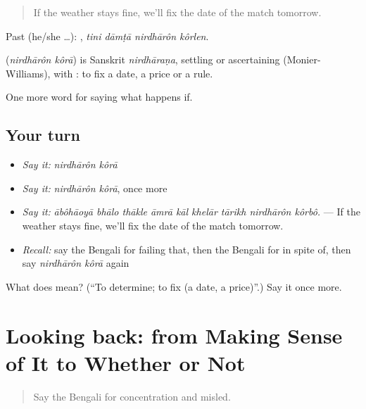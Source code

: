 \begin{quote}
If the weather stays fine, we'll fix the date of the match tomorrow.
\end{quote}

Past (he/she …):    , \emph{tini dāmṭā nirdhārôn kôrlen}.

\begin{cousinweb}
\textbf{ } (\emph{nirdhārôn kôrā}) is Sanskrit \emph{nirdhāraṇa}, settling or ascertaining (Monier-Williams), with : to fix a date, a price or a rule.
\end{cousinweb}

\begin{grammarlens}[title={What you've built}]
One more word for saying what happens if.
\end{grammarlens}

\subsection*{Your turn}
\begin{itemize}
\raggedright
  \item \emph{Say it:} \emph{nirdhārôn kôrā}
  \item \emph{Say it:} \emph{nirdhārôn kôrā}, once more
  \item \emph{Say it:} \emph{ābôhāoyā bhālo thākle āmrā kāl khelār tārikh nirdhārôn kôrbô.} — If the weather stays fine, we'll fix the date of the match tomorrow.
  \item \emph{Recall:} say the Bengali for failing that, then the Bengali for in spite of, then say \emph{nirdhārôn kôrā} again
\end{itemize}

\begin{tcolorbox}[breakable,colback=teal!4,colframe=teal!35!black,title={Before you move on}]
What does   mean? (\textquotedblleft{}To determine; to fix (a date, a price)\textquotedblright{}.) Say it once more.
\end{tcolorbox}
\section[(dialogue)]{Looking back: from Making Sense of It to Whether or Not}

\label{lesson:BN-R369-review-362-369}



\begin{quote}
Say the Bengali for concentration and misled.
\end{quote}

